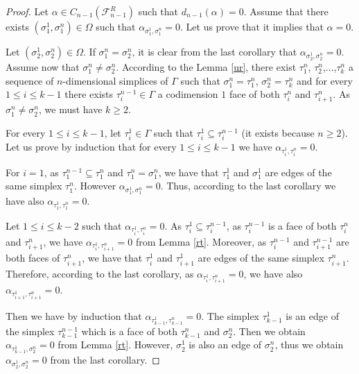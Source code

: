 \documentclass{article}
\begin{document}
\begin{proof}
    Let $\alpha \in C_{n-1}(\mathcal{F}_{n-1}^{R})$ such that $d_{n-1}(\alpha) = 0$. Assume that there exists $(\sigma^1_1,\sigma^n_1) \in \Omega$ such that $\alpha_{\sigma^1_1,\sigma^n_1} = 0$. Let us prove that it implies that $\alpha = 0$.

    Let $(\sigma^1_2,\sigma^n_2) \in \Omega$. If $\sigma^n_1 = \sigma^n_2$, it is clear from the last corollary that $\alpha_{\sigma^1_2,\sigma^n_2} = 0$. Assume now that $\sigma^n_1 \neq \sigma^n_2$. According to the Lemma \ref{ur}, there exist $\tau^n_1$, $\tau^n_2$,...,$\tau^n_k$ a sequence of $n$-dimensional simplices of $\Gamma$ such that $\sigma^n_1 = \tau^n_1$, $\sigma^n_2 = \tau^n_k$ and for every $1 \leq i \leq k-1$ there exists $\tau^{n-1}_i \in \Gamma$ a codimension $1$ face of both $\tau^n_i$ and $\tau^n_{i+1}$. As $\sigma^n_1 \neq \sigma^n_2$, we must have $k \geq 2$.

    For every $1\leq i \leq k-1$, let $\tau^1_i \in \Gamma$ such that $\tau^1_i \subseteq \tau^{n-1}_i$ (it exists because $n \geq 2$). Let us prove by induction that for every $1 \leq i \leq k-1$ we have $\alpha_{\tau^1_i,\tau^n_i} = 0$.
    
    For $i = 1$, as $\tau^{n-1}_1 \subseteq \tau^n_1$ and $\tau^n_1 = \sigma^n_1$, we have that $\tau^1_1$ and $\sigma^1_1$ are edges of the same simplex $\tau^n_1$. However $\alpha_{\sigma^1_1,\sigma^n_1} = 0$. Thus, according to the last corollary we have also $\alpha_{\tau^1_1,\tau^n_1} = 0$.

    Let $1 \leq i \leq k-2$ such that $\alpha_{\tau^1_i,\tau^n_i} = 0$. As $\tau^1_i \subseteq \tau^{n-1}_i$, as $\tau^{n-1}_i$ is a face of both $\tau^n_{i}$ and $\tau^n_{i+1}$, we have $\alpha_{\tau^1_i,\tau^n_{i+1}} = 0$ from Lemma \ref{rt}. Moreover, as $\tau^{n-1}_i$ and $\tau^{n-1}_{i+1}$ are both faces of $\tau^n_{i+1}$, we have that $\tau^1_i$ and $\tau^1_{i+1}$ are edges of the same simplex $\tau^n_{i+1}$. Therefore, according to the last corollary, as $\alpha_{\tau^1_i,\tau^n_{i+1}} = 0$, we have also $\alpha_{\tau^1_{i+1},\tau^n_{i+1}} = 0$.

    Then we have by induction that $\alpha_{\tau^1_{k-1},\tau^n_{k-1}} = 0$. The simplex $\tau^1_{k-1}$ is an edge of the simplex $\tau^{n-1}_{k-1}$ which is a face of both $\tau^{n}_{k-1}$ and $\sigma^n_2$. Then we obtain $\alpha_{\tau^1_{k-1},\sigma^n_2} = 0$ from Lemma \ref{rt}. However, $\sigma^1_2$ is also an edge of $\sigma^n_2$, thus we obtain $\alpha_{\sigma^1_2,\sigma^n_2} = 0$ from the last corollary.


\end{proof}
\end{document}
